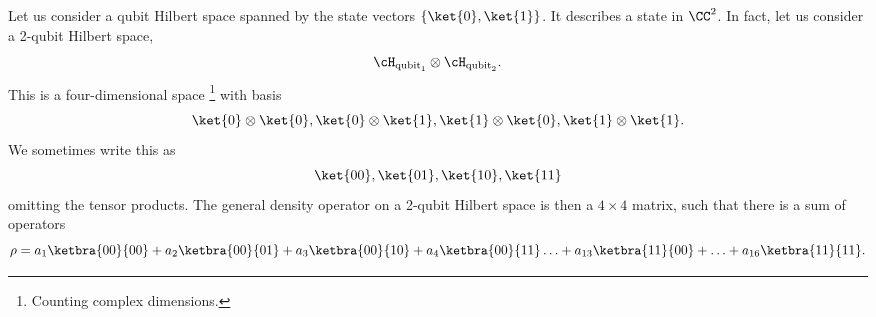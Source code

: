 Let us consider a qubit Hilbert space spanned by the state vectors $\set{\ket{0},\ket{1}}$. It describes a state in $\CC^2$. In fact, let us consider a 2-qubit Hilbert space,
\begin{equation}
    \cH_{\text{qubit}_1} \otimes \cH_{\text{qubit}_2}.
\end{equation}
This is a four-dimensional space%
    \footnote{Counting complex dimensions.}
with basis
\begin{equation}
    \ket{0}\otimes \ket{0}, \ket{0} \otimes\ket{1}, \ket{1} \otimes\ket{0} ,\ket{1}\otimes \ket{1}.
\end{equation}
We sometimes write this as
\begin{equation}
    \ket{00},\ket{01},\ket{10},\ket{11}
\end{equation}
omitting the tensor products. The general density operator on a 2-qubit Hilbert space is then a $4\times 4$ matrix, such that there is a sum of operators
\begin{equation}
    \rho = a_1 \ketbra{00}{00} + a_2 \ketbra{00}{01} + a_3 \ketbra{00}{10} + a_4 \ketbra{00}{11}\ldots + a_{13}\ketbra{11}{00} +\ldots + a_{16} \ketbra{11}{11}.
\end{equation}

